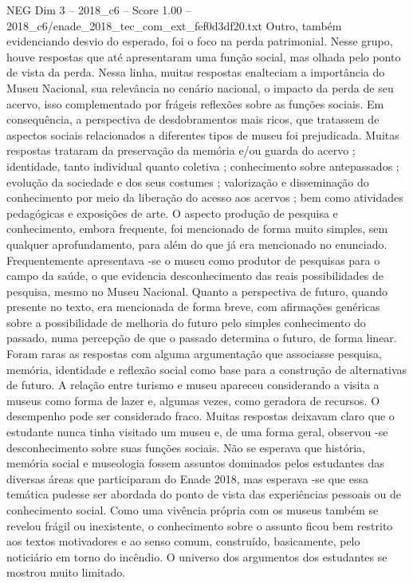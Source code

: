 \begin{textsample}{NEG Dim 3 – 2018\_c6 – Score 1.00 – 2018\_c6/enade\_2018\_tec\_com\_ext\_fef0d3df20.txt}
Outro, também evidenciando desvio do esperado, foi o foco na perda patrimonial.
Nesse grupo, houve respostas que até apresentaram uma função social, mas olhada pelo ponto de vista da perda.
Nessa linha, muitas respostas enalteciam a importância do Museu Nacional, sua relevância no cenário nacional, o impacto da perda de seu acervo, isso complementado por frágeis reflexões sobre as funções sociais.
Em consequência, a perspectiva de desdobramentos mais ricos, que tratassem de aspectos sociais relacionados a diferentes tipos de museu foi prejudicada.
Muitas respostas trataram da preservação da memória e/ou guarda do acervo ; identidade, tanto individual quanto coletiva ; conhecimento sobre antepassados ; evolução da sociedade e dos seus costumes ; valorização e disseminação do conhecimento por meio da liberação do acesso aos acervos ; bem como atividades pedagógicas e exposições de arte.
O aspecto produção de pesquisa e conhecimento, embora frequente, foi mencionado de forma muito simples, sem qualquer aprofundamento, para além do que já era mencionado no enunciado.
Frequentemente apresentava -se o museu como produtor de pesquisas para o campo da saúde, o que evidencia desconhecimento das reais possibilidades de pesquisa, mesmo no Museu Nacional.
Quanto a perspectiva de futuro, quando presente no texto, era mencionada de forma breve, com afirmações genéricas sobre a possibilidade de melhoria do futuro pelo simples conhecimento do passado, numa percepção de que o passado determina o futuro, de forma linear.
Foram raras as respostas com alguma argumentação que associasse pesquisa, memória, identidade e reflexão social como base para a construção de alternativas de futuro.
A relação entre turismo e museu apareceu considerando a visita a museus como forma de lazer e, algumas vezes, como geradora de recursos.
O desempenho pode ser considerado fraco.
Muitas respostas deixavam claro que o estudante nunca tinha visitado um museu e, de uma forma geral, observou -se desconhecimento sobre suas funções sociais.
Não se esperava que história, memória social e museologia fossem assuntos dominados pelos estudantes das diversas áreas que participaram do Enade 2018, mas esperava -se que essa temática pudesse ser abordada do ponto de vista das experiências pessoais ou de conhecimento social.
Como uma vivência própria com os museus também se revelou frágil ou inexistente, o conhecimento sobre o assunto ficou bem restrito aos textos motivadores e ao senso comum, construído, basicamente, pelo noticiário em torno do incêndio.
O universo dos argumentos dos estudantes se mostrou muito limitado.

\end{textsample}
